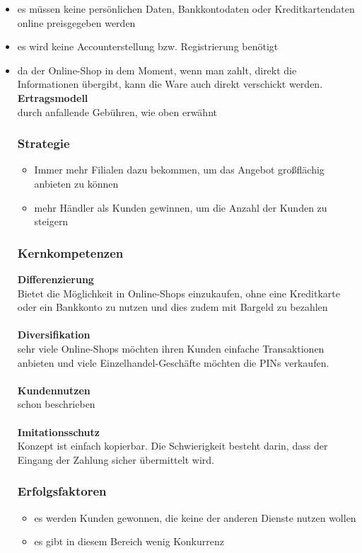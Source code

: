 \begin{itemize}
\item es müssen keine persönlichen Daten, Bankkontodaten oder Kreditkartendaten online preisgegeben werden
\item es wird keine Accounterstellung bzw. Registrierung benötigt
\item da der Online-Shop in dem Moment, wenn man zahlt, direkt die Informationen übergibt, kann die Ware auch direkt verschickt werden.
\\
\textbf{Ertragsmodell}\\
durch anfallende Gebühren, wie oben erwähnt\\
\subsubsection{Strategie}
\begin{itemize}
\item Immer mehr Filialen dazu bekommen, um das Angebot großflächig anbieten zu können
\item mehr Händler als Kunden gewinnen, um die Anzahl der Kunden zu steigern
\end{itemize}
\subsubsection{Kernkompetenzen}
\textbf{Differenzierung}\\
Bietet die Möglichkeit in Online-Shops einzukaufen, ohne eine Kreditkarte oder ein Bankkonto zu nutzen und dies zudem
mit Bargeld zu bezahlen\\
\\
\textbf{Diversifikation}\\
sehr viele Online-Shops möchten ihren Kunden einfache Transaktionen anbieten und viele Einzelhandel-Geschäfte möchten
die PINs verkaufen.\\
\\
\textbf{Kundennutzen}\\
schon beschrieben\\
\\
\textbf{Imitationsschutz}\\
Konzept ist einfach kopierbar. Die Schwierigkeit besteht darin, dass der Eingang der Zahlung sicher übermittelt wird.\\

\subsubsection{Erfolgsfaktoren}
\begin{itemize}
\item es werden Kunden gewonnen, die keine der anderen Dienste nutzen wollen
\item es gibt in diesem Bereich wenig Konkurrenz
\end{itemize}

\end{itemize}
